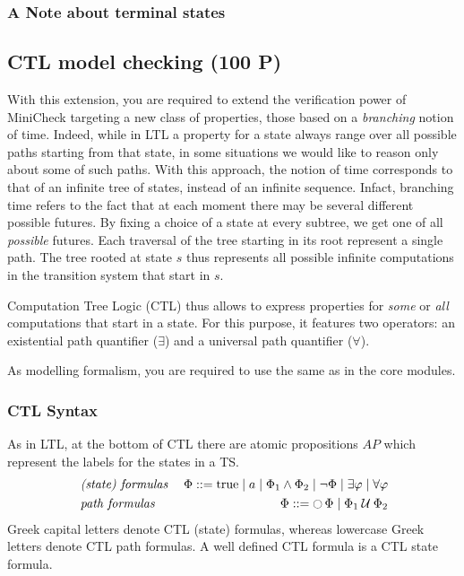 \documentclass{article}
\begin{document}


\subsubsection*{A Note about terminal states}



\subsection{CTL model checking (100 P)}
With this extension, you are required to extend the verification power of MiniCheck targeting a new class 
of properties, those based on a \emph{branching} notion of time. Indeed, while in LTL a property for a state 
always range over all possible paths starting from that state, in some situations we would like to reason only
about some of such paths. With this approach, the notion of time corresponds to that of an infinite tree of states, 
instead of an infinite sequence. Infact, branching time refers to the fact that at each moment there may be 
several different possible futures. By fixing a choice of a state at every subtree, we get one of all \emph{possible}
futures. Each traversal of the tree starting in its root represent a single path. The tree rooted
at state $s$ thus represents all possible infinite computations in the transition system that
start in $s$.

Computation Tree Logic (CTL) thus allows to express properties for \emph{some} or \emph{all} computations 
that start in a state. For this purpose, it features two operators: an existential path quantifier ($\exists$) 
and a universal path quantifier ($\forall$). 

As modelling formalism, you are required to use the same as in the core modules.

\subsubsection*{CTL Syntax}
As  in LTL, at the bottom of CTL there are atomic propositions $AP$ which represent the labels for the states in a TS.
\begin{align*}
    &\; \emph{(state) formulas} &\; \Phi ::= \text{true} \mid a \mid \Phi_1 \land \Phi_2 \mid \neg \Phi \mid \exists \varphi \mid \forall \varphi \\
    &\; \emph{path formulas}    &\; \Phi ::= \mathop{\ocircle}{\Phi} \mid \Phi_1 \mathbin{\mathcal{U}} \Phi_2
\end{align*}
Greek capital letters denote CTL (state) formulas, whereas lowercase Greek letters denote CTL path formulas. 
A well defined CTL formula is a CTL state formula.
\end{document}
